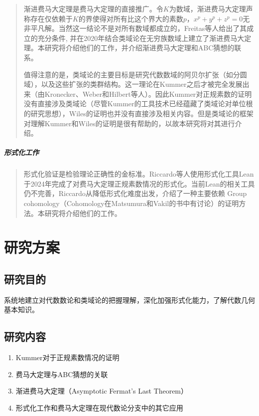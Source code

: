 \documentclass{article}
\newcommand{\upcite}[1]{\textsuperscript{\textsuperscript{\cite{#1}}}}
\begin{document}
\begin{quote}
渐进费马大定理是费马大定理的直接推广。令$K$为数域，渐进费马大定理声称存在仅依赖于$K$的界使得对所有比这个界大的素数$p$，$x^p + y^p + z^p=0$无非平凡解。当然这一结论不是对所有数域都成立的，Freitas等人给出了其成立的充分条件\upcite{ref13}, 并在2020年结合类域论在无穷族数域上建立了渐进费马大定理\upcite{ref10}。本研究将介绍他们的工作，并介绍渐进费马大定理和ABC猜想的联系。

值得注意的是，类域论的主要目标是研究代数数域的阿贝尔扩张（如分圆域）\upcite{ref6}，以及这些扩张的类群结构\upcite{ref4}。这一理论在Kummer之后才被完全发展出来（由Kronecker、Weber和Hilbert等人）。因此Kummer对正规素数的证明没有直接涉及类域论（尽管Kummer的工具技术已经蕴藏了类域论对单位根的研究思想），Wiles的证明也并没有直接涉及相关内容。但是类域论的框架对理解Kummer和Wiles的证明是很有帮助的，以故本研究将对其进行介绍。
\end{quote}

\subparagraph{形式化工作}

\begin{quote}
形式化验证是检验理论正确性的金标准。Riccardo等人使用形式化工具Lean于2024年完成了对费马大定理正规素数情况的形式化。当前Lean的相关工具仍不完善，Riccardo从降低形式化难度出发，介绍了一种主要依赖 Group cohomology（Cohomology在Matsumura\upcite{ref5}和Vakil\upcite{ref7}的书中有讨论）的证明方法。本研究将介绍他们的工作\upcite{ref12}。
\end{quote}

\newpage
\section{研究方案}

\subsection{研究目的}

\noindent
系统地建立对代数数论和类域论的把握理解，深化加强形式化能力，了解代数几何基本知识。

\subsection{研究内容}

\begin{enumerate}
\item Kummer对于正规素数情况的证明
\item 费马大定理与ABC猜想的关联
\item 渐进费马大定理（Asymptotic Fermat's Last Theorem）
\item 形式化工作和费马大定理在现代数论分支中的其它应用
\end{enumerate}
\end{document}
